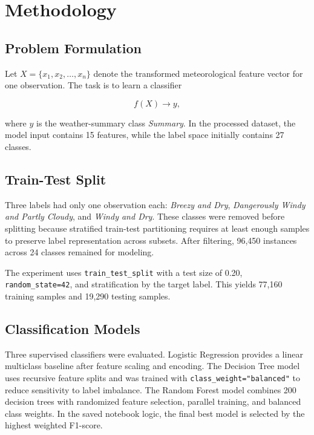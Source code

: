 \documentclass[10pt,letterpaper,twocolumn]{article}
\begin{document}
\section{Methodology}

\subsection{Problem Formulation}

Let $X = \{x_1, x_2, \ldots, x_n\}$ denote the transformed meteorological feature vector for one observation. The task is to learn a classifier

\begin{equation}
f(X) \rightarrow y,
\end{equation}

where $y$ is the weather-summary class \textit{Summary}. In the processed dataset, the model input contains 15 features, while the label space initially contains 27 classes.

\subsection{Train-Test Split}

Three labels had only one observation each: \textit{Breezy and Dry}, \textit{Dangerously Windy and Partly Cloudy}, and \textit{Windy and Dry}. These classes were removed before splitting because stratified train-test partitioning requires at least enough samples to preserve label representation across subsets. After filtering, 96,450 instances across 24 classes remained for modeling.

The experiment uses \texttt{train\_test\_split} with a test size of 0.20, \texttt{random\_state=42}, and stratification by the target label. This yields 77,160 training samples and 19,290 testing samples.

\subsection{Classification Models}

Three supervised classifiers were evaluated. Logistic Regression \cite{cox1958binary} provides a linear multiclass baseline after feature scaling and encoding. The Decision Tree model \cite{quinlan1986decision} uses recursive feature splits and was trained with \texttt{class\_weight="balanced"} to reduce sensitivity to label imbalance. The Random Forest model \cite{breiman2001random} combines 200 decision trees with randomized feature selection, parallel training, and balanced class weights. In the saved notebook logic, the final best model is selected by the highest weighted F1-score.
\end{document}
